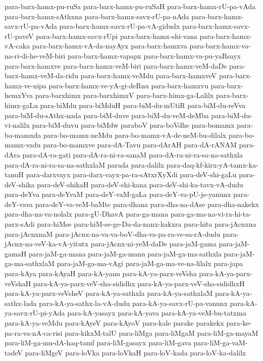 {para-barx-hamx-pu-ruSa
para-barx-hamx-pu-ruSaH
para-barx-hamx-rU-pa-vAda
para-barx-hamx-sAthxna
para-barx-hamx-savx-rU-pa-nAda
para-barx-hamx-savx-rU-pa-vAda
para-barx-hamx-savx-rU-pa-vA-gidudx
para-barx-hamx-savx-rU-paveV
para-barx-hamx-savx-rUpi
para-barx-hamx-shi-vana
para-barx-hamx-vA-caka
para-barx-hamx-vA-da-nayAyx
para-barx-hamxva
para-barx-hamx-va-na-ri-di-he-veM-biri
para-barx-hamx-vapapx
para-barx-hamx-va-pu-yaRsayx
para-barx-hamxve
para-barx-hamx-veM-biri
para-barx-hamx-veM-daDe
para-barx-hamx-veM-da-ridu
para-barx-hamx-veMdu
para-barx-hamxveV
para-barx-hamx-ve-nipa
para-barx-hamx-ve-yA-gi-deRnu
para-barx-hamxvu
para-barx-hemxYva
para-barxhimx
para-barxhimxV
para-barx-himx-ga-Lalilx
para-barx-himx-gaLu
para-biMdu
para-biMduH
para-biM-du-mUtiR
para-biM-du-reVva
para-biM-du-sAthx-nada
para-biM-duve
para-biM-du-veM-deMba
para-biM-du-vi-nalilx
para-biM-duvu
para-biMdw
paraboV
para-boVdhe
para-bomamx
para-bo-mamxda
para-bo-mamx-neMdu
para-bo-mamx-vA-de-neM-bu-dilalx
para-bo-mamx-vadu
para-bo-mamxve
para-dA-Tavu
para-dArAH
para-dA-rANAM
para-dAra
para-dA-ra-gati
para-dA-ra-ni-ra-sanaM
para-dA-ra-ni-ra-sa-na-sathxla
para-dA-ra-ni-ra-sa-na-sathxlaM
parada
para-dalilx
para-daq-kf-kirx-yA-tamx-ka-tanuH
para-darxvayx
para-darx-vayx-pa-ra-sAtxrXyXdi
para-deV-shi-gaLu
para-deV-shika
para-deV-shikaH
para-deV-shi-kana
para-deV-shi-ka-tavx-vA-dudu
para-deYva
para-deYvaM
para-deY-vaM-gaLa
para-deY-va-pU-je-yanunx
para-deY-vava
para-deY-va-veM-baMte
para-dhana
para-dha-na-dAse
para-dha-nakekx
para-dha-na-va-nolalx
para-gU-DhavA
para-ga-mana
para-ga-ma-na-vi-ra-hi-ta-parx-sAdi
para-hiMse
para-hiM-se-ge-Da-da-nanx-kakxra
para-hita
para-jAcnxna
para-jAcnxnaM
para-jAcnx-na-va-va-boV-dha-va-pa-ra-ve-sa-rA-dudu
para-jAcnx-na-veV-ka-vA-yitutx
para-jAcnx-ni-yeM-daDe
para-jaM-gama
para-jaM-gamaH
para-jaM-ga-mana
para-jaM-ga-manu
para-jaM-ga-ma-sathxla
para-jaM-ga-ma-sathxlaM
para-jaM-ga-ma-vAgi
para-jaM-ga-ma-ve-na-lilalx
para-japa
para-kAya
para-kAyaH
para-kA-yanu
para-kA-ya-parx-veVsha
para-kA-ya-parx-veVshaH
para-kA-ya-parx-veV-sha-sididhx
para-kA-ya-parx-veV-sha-sididhxH
para-kA-ya-parx-veVsheV
para-kA-ya-sathxla
para-kA-ya-sathxlaM
para-kA-ya-sathx-lada
para-kA-ya-sathx-la-vA-dudu
para-kA-ya-savx-rU-pa-vanunx
para-kA-ya-savx-rU-pi-yAda
para-kA-yasayx
para-kA-yava
para-kA-ya-veM-bu-tatxma
para-kA-ya-veMdu
para-kAyeV
para-kAyoV
para-kale
parake
parakekx
para-ke-pa-ra-va-nA-ca-risi
para-kikxM-talU
para-liMga
para-liMgaM
para-liM-ga-mayaM
para-liM-ga-mu-dA-haq-tamf
para-liM-gasayx
para-liM-gava
para-liM-ga-vaM-tadeV
para-liMgeV
para-loVka
para-loVkaH
para-loV-kada
para-loV-ka-dalilx
}
